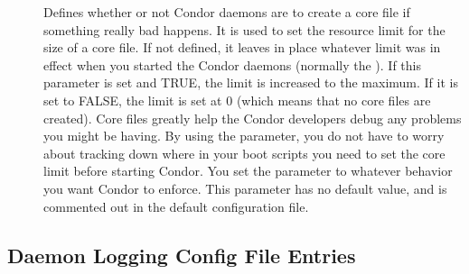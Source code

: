 \begin{description}
\item[] \label{param:CreateCoreFiles}
  Defines whether or not Condor daemons are to
  create a core file if something really bad happens.  It is
  used to set
  the resource limit for the size of a core file.  If not defined,
  it leaves in place whatever limit was in effect
  when you started the Condor daemons (normally the ).
  If this parameter is set and TRUE, the limit is increased to
  the maximum.  If it is set to FALSE, the limit is set at 0
  (which means that no core files are created).  Core files
  greatly help the Condor developers debug any problems you might be
  having.  By using the parameter, you do not have to worry about
  tracking down where in your boot scripts you need to set the core
  limit before starting Condor. You set the parameter
  to whatever behavior you want Condor to enforce.  This parameter has
  no default value, and is commented out in the default configuration file. 

\end{description}


\subsection{\label{sec:Daemon-Logging-Config-File-Entries}
Daemon Logging Config File Entries}

